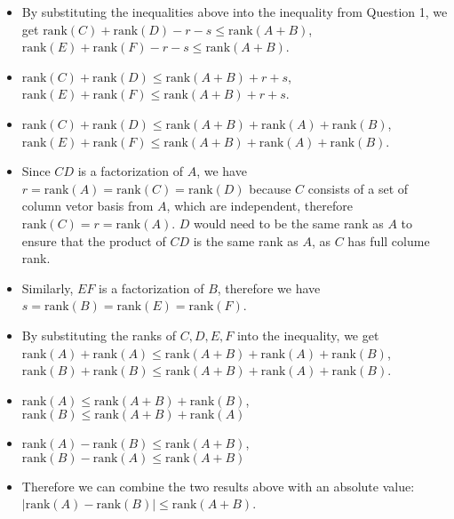 \documentclass[10pt]{article}
\begin{document}
{{\begin{enumerate}
\begin{itemize}
\begin{itemize}
				\item Since \( \text{col}(E) \subseteq \text{col}(X) \), then \( \text{rank}(E) \leq \text{rank}(X) \).
				\item Since \( \text{row}(D) \subseteq \text{row}(Y) \), then \( \text{rank}(D) \leq \text{rank}(Y) \).
				\item Since \( \text{row}(F) \subseteq \text{row}(Y) \), then \( \text{rank}(F) \leq \text{rank}(Y) \).
			\end{itemize}
			\item By substituting the inequalities above into the inequality from Question 1, we get \( \text{rank}(C) + \text{rank}(D) - r - s \leq \text{rank}(A+B) \), \(\text{rank}(E) + \text{rank}(F) - r - s \leq \text{rank}(A+B)\).
			\item \(\text{rank}(C) + \text{rank}(D) \leq \text{rank}(A + B) + r + s\), \(\text{rank}(E) + \text{rank}(F) \leq \text{rank}(A + B) + r + s\).
			\item \(\text{rank}(C) + \text{rank}(D) \leq \text{rank}(A + B) + \text{rank}(A) + \text{rank}(B)\), \(\text{rank}(E) + \text{rank}(F) \leq \text{rank}(A + B) + \text{rank}(A) + \text{rank}(B)\).
			\item Since \(CD\) is a factorization of \(A\), we have \(r = \text{rank}(A) = \text{rank}(C) = \text{rank}(D)\) because $C$ consists of a set of column vetor basis from $A$, which are independent, therefore \(\text{rank}(C) = r = \text{rank}(A)\). $D$ would need to be the same rank as $A$ to ensure that the product of $CD$ is the same rank as $A$, as $C$ has full colume rank.
			\item Similarly, \(EF\) is a factorization of \(B\), therefore we have \(s = \text{rank}(B) = \text{rank}(E) = \text{rank}(F)\).
			\item By substituting the ranks of \(C, D, E, F\) into the inequality, we get \(\text{rank}(A) + \text{rank}(A) \leq \text{rank}(A + B) + \text{rank}(A) + \text{rank}(B)\), \(\text{rank}(B) + \text{rank}(B) \leq \text{rank}(A + B) + \text{rank}(A) + \text{rank}(B)\).
			\item \(\text{rank}(A) \leq \text{rank}(A + B) + \text{rank}(B)\), \(\text{rank}(B) \leq \text{rank}(A + B) + \text{rank}(A)\)
			\item \(\text{rank}(A) - \text{rank}(B) \leq \text{rank}(A + B)\), \(\text{rank}(B) - \text{rank}(A) \leq \text{rank}(A + B)\)
			\item Therefore we can combine the two results above with an absolute value: \(| \text{rank}(A) - \text{rank}(B) | \leq \text{rank}(A + B)\).
		\end{itemize}
	\end{enumerate}

	}
}
\end{document}
